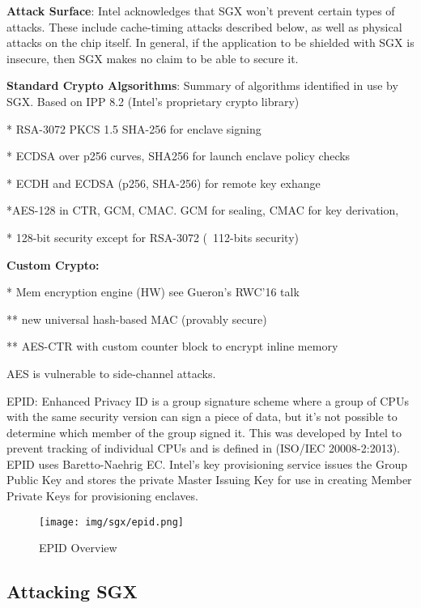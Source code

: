 \textbf{Attack Surface}: Intel acknowledges that SGX won't prevent certain types of attacks. These include cache-timing attacks described below, as well as physical attacks on the chip itself. In general, if the application to be shielded with SGX is insecure, then SGX makes no claim to be able to secure it. 

\textbf{Standard Crypto Algsorithms}: Summary of algorithms identified in use by SGX. Based on IPP 8.2 (Intel's proprietary crypto library) 

* RSA-3072 PKCS 1.5 SHA-256 for enclave signing

* ECDSA over p256 curves, SHA256 for launch enclave policy checks

* ECDH and ECDSA (p256, SHA-256) for remote key exhange

*AES-128 in CTR, GCM, CMAC. GCM for sealing, CMAC for key derivation,

* 128-bit security except for RSA-3072 (~112-bits security)

\textbf{Custom Crypto:}

* Mem encryption engine (HW) see Gueron's RWC'16 talk

** new universal hash-based MAC (provably secure)

** AES-CTR with custom counter block to encrypt inline memory

AES is vulnerable to side-channel attacks. 

\cite{SGXinpractice}


EPID\cite{Brickell_Li_2009}: Enhanced Privacy ID is a group signature scheme where a group of CPUs with the same security version can sign a piece of data, but it's not possible to determine which member of the group signed it. This was developed by Intel to prevent tracking of individual CPUs and is defined in (ISO/IEC 20008-2:2013). EPID uses Baretto-Naehrig EC. Intel's key provisioning service issues the Group Public Key and stores the private Master Issuing Key for use in creating Member Private Keys for provisioning enclaves. 


\begin{figure}[H]
\centering
\texttt{[image: img/sgx/epid.png]}
\caption{EPID Overview \protect\cite{Brickell_Li_2009}}
\end{figure}





\subsection{Attacking SGX}

